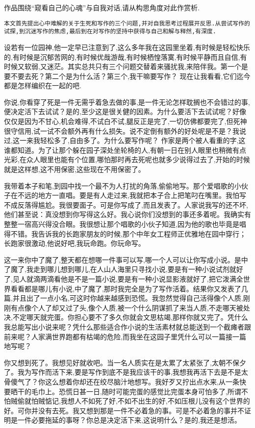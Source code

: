 \documentclass{ctexart}
\newcommand{\nm}{\normalsize}
\begin{document}
作品围绕``窥看自己的心魂''与自我对话,请从构思角度对此作赏析.

\texttt{本文首先提出心中难解的关于生死和写作的三个问题,并对自我思考过程展开反思.从尝试写作的试探,到沉迷写作的焦虑,最后到在对写作的坚持中获得与自己和解与释然,有深度.}

\nm \fangsong

设若有一位园神,他一定早已注意到了,这么多年我在这园里坐着,有时候是轻松快乐的,有时候是沉郁苦网的,有时候优哉游哉,有时候栖惶落寞,有时候平静而且自信,有时候又软弱,又迷茫。其实总共只有三个问题交替着来骚扰我,来陪伴我。第一个是要不要去死？第二个是为什么活？第三个,我干嘛要写作？ 现在让我看看,它们迄今都是怎样编织在一起的吧.

你说,你看穿了死是一件无需乎着急去做的事,是一件无论怎样耽搁也不会错过的事,便决定活下去试试？是的,至少这是很关健的因素。为什么要活下去试试呢？好像仅仅是因为不甘心,机会难得,不试白不试,腿反正是完了,一切仿佛都要完了,但死神很守信用,试一试不会额外再有什么损失。说不定倒有额外的好处呢是不是？我说过,这一来我轻松多了,自由多了。为什么要写作呢？ 作家是两个被人看重的字,这谁都知道。为了让那个躲在园子深处坐轮椅的人,有朝一日在别人眼里也稍微有点光彩,在众人眼里也能有个位置,哪怕那时再去死呢也就多少说得过去了,开始的时候就是这样想,这不用保密,这些现在不用保密了。

我带着本子和笔,到园中找一个最不为人打扰的角落,偷偷地写。那个爱唱歌的小伙子在不远的地方一直唱。要是有人走过来,我就把本子合上把笔叼在嘴里。我怕写不成反落得尴尬。我很要面子。可是你写成了,而且发表了。人家说我写的还不坏,他们甚至说：真没想到你写得这么好。我心说你们没想到的事还多着呢。我确实有整整一宿高兴得没合眼。我很想让那个唱歌的小伙子知道,因为他的歌也毕竟是唱得不错。我告诉我的长跑家朋友的时候,那个中年女工程师正优雅地在园中穿行；长跑家很激动,他说好吧,我玩命跑。你玩命写。

这一来你中了魔了,整天都在想哪一件事可以写,哪一个人可以让你写成小说。是中了魔了,我走到哪儿想到哪儿,在人山人海里只寻找小说,要是有一种小说试剂就好了,见人就滴两滴看他是不是一篇小说,要是有一种小说显影液就好了,把它泼满全世界看看都是哪儿有小说,中了魔了,那时我完全是为了写作活着。结果你又发表了几篇,并且出了一点小名,可这时你越来越感到恐慌。我忽然觉得自己活得像个人质,刚刚有点像个人了却又过了头,像个人质,被一个什么阴谋抓了来当人质,不走哪天被处决,不定哪天就完蛋。你担心要不了多久你就会文思枯竭,那样你就又完了。凭什么我总能写出小说来呢？凭什么那些适合作小说的生活素材就总能送到一个截瘫者跟前来呢？人家满世界跑都有枯竭的危险,而我坐在这园子里凭什么可以一篇接一篇地写呢？

你又想到死了。我想见好就收吧。当一名人质实在是太累了太紧张了,太朝不保夕了。我为写作而活下来,要是写作到底不是我应该干的事,我想我再活下去是不是太骨傻气了？你这么想着你却还在绞尽脑汁地想写。我好歹又拧出点水来,从一条快要晒干的毛巾上。恐慌日甚一日,随时可能完蛋的感觉比完蛋本身可怕多了,所谓不怕贼偷就怕贼惦记,我想人不如死了好,不如不出生的好,不如压根儿没有这个世界的好。可你并没有去死。我又想到那是一件不必着急的事。可是不必着急的事并不证明是一件必要拖延的事呀？你总是决定活下来,这说明什么？是的,我还是想活。
\end{document}
